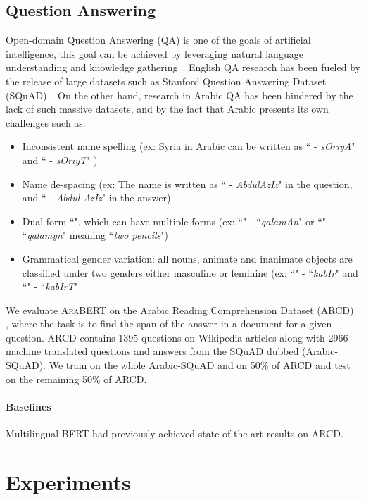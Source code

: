 \documentclass[10pt, a4paper]{article}
\begin{document}
\subsection{Question Answering}
Open-domain Question Answering (QA) is one of the goals of artificial intelligence, this goal can be achieved by leveraging natural language understanding and knowledge gathering~\cite{47761}. English QA research has been fueled by the release of large datasets such as Stanford Question Answering Dataset (SQuAD)~\cite{rajpurkar2016squad}. On the other hand, research in Arabic QA has been hindered by the lack of such massive datasets, and by the fact that Arabic presents its own challenges such as:
\begin{itemize}
\setlength\itemsep{-1em}
    \item Inconsistent name spelling (ex: Syria in Arabic can be written as `` - \textit{sOriyA}" and `` - \textit{sOriyT}" )
    \item Name de-spacing (ex: The name is written as `` - \textit{AbdulAzIz}" in the question, and  `` - \textit{Abdul AzIz}" in the answer)
    \item Dual form ``", which can have multiple forms (ex: ``" - ``\textit{qalamAn}" or ``" - ``\textit{qalamyn}" meaning ``\textit{two pencils}")
    \item Grammatical gender variation: all nouns, animate and inanimate objects are classified under two genders either masculine or feminine (ex: ``" - ``\textit{kabIr}" and ``" - ``\textit{kabIrT}"
\end{itemize}

We evaluate \textsc{AraBERT} on the Arabic Reading Comprehension Dataset (ARCD)~\cite{mozannar2019neural}
, where the task is to find the span of the answer in a document for a given question.
ARCD contains 1395 questions on Wikipedia articles along with 2966  machine translated questions and answers from the SQuAD dubbed (Arabic-SQuAD). We train on the whole Arabic-SQuAD and on 50\% of ARCD and test on the remaining 50\% of ARCD.

\paragraph{Baselines} Multilingual BERT had previously achieved state of the art results on ARCD.
 \section{Experiments}
\label{sec:experiments}
\end{document}
